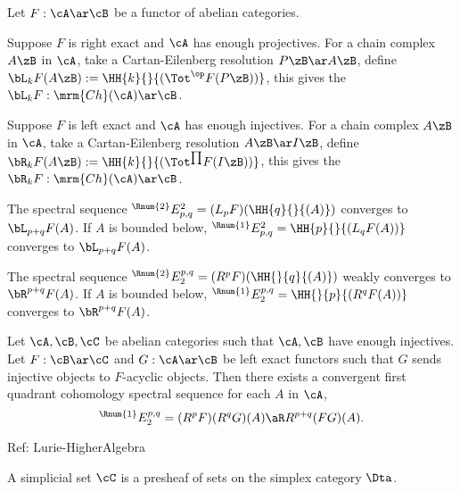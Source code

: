 \documentclass[article, a4paper, twoside]{universal}
\begin{document}
\begin{dfn}[5.7.4, 5.7.9]
    Let $F:\cA\ar\cB$ be a functor of abelian categories.

    \begin{itm}
        \item Suppose $F$ is right exact and $\cA$ has enough projectives. For a chain complex $A\zB$ in $\cA$, take a Cartan-Eilenberg resolution $P\zB\ar A\zB$, define $\bL_{k}F(A\zB):=\HH{k}{}{(\Tot^{\op}F(P\zB))}$, this gives the  $\bL_{k}F:\mrm{Ch}(\cA)\ar\cB$.
        \item Suppose $F$ is left exact and $\cA$ has enough injectives. For a chain complex $A\zB$ in $\cA$, take a Cartan-Eilenberg resolution $A\zB\ar I\zB$, define $\bR_{k}F(A\zB):=\HH{k}{}{(\Tot^{\prod}F(I\zB))}$, this gives the  $\bR_{k}F:\mrm{Ch}(\cA)\ar\cB$.
    \end{itm}

\end{dfn}

\begin{thm}[5.7.6, 5.7.9]
    The spectral sequence ${}^{\Rnum{2}}E_{p,q}^{2}=(L_{p}F)(\HH{q}{}{(A)})$ converges to $\bL_{p+q}F(A)$. If $A$ is bounded below, ${}^{\Rnum{1}}E_{p,q}^{2}=\HH{p}{}{(L_{q}F(A))}$ converges to $\bL_{p+q}F(A)$.

    The spectral sequence ${}^{\Rnum{2}}E_{2}^{p,q}=(R^{p}F)(\HH{}{q}{(A)})$ weakly converges to $\bR^{p+q}F(A)$. If $A$ is bounded below, ${}^{\Rnum{1}}E_{2}^{p,q}=\HH{}{p}{(R^{q}F(A))}$ converges to $\bR^{p+q}F(A)$.
\end{thm}

\begin{thm}[Grothendieck, 5.8.3]
    Let $\cA,\cB,\cC$ be abelian categories such that $\cA,\cB$ have enough injectives. Let $F:\cB\ar\cC$ and $G:\cA\ar\cB$ be left exact functors such that $G$ sends injective objects to $F$-acyclic objects. Then there exists a convergent first quadrant cohomology spectral sequence for each $A$ in $\cA$,
    \[
        {}^{\Rnum{1}}E_{2}^{p,q}=(R^{p}F)(R^{q}G)(A)\aR R^{p+q}(FG)(A).
    \]
\end{thm}

Ref: Lurie-HigherAlgebra


\begin{dfn}
    A simplicial set $\cC$ is a presheaf of sets on the simplex category $\Dta$.
\end{dfn}
\end{document}
